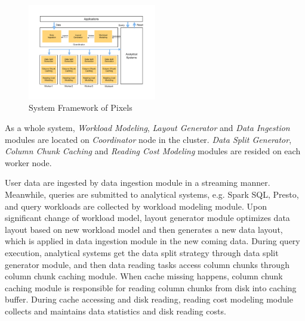 \begin{figure}[h!]
	\vspace{-1em}
	\centering
	\includegraphics[width=0.5\textwidth, height=0.36\textwidth]{figs/framework}
	\vspace{-3em}
	\caption{System Framework of Pixels}\label{fig:overview}
	\vspace{-0em}
\end{figure}

As a whole system, \textit{Workload Modeling}, \textit{Layout Generator} and \textit{Data Ingestion} modules are located on \textit{Coordinator} node in the cluster. \textit{Data Split Generator}, \textit{Column Chunk Caching} and \textit{Reading Cost Modeling} modules are resided on each worker node.

User data are ingested by data ingestion module in a streaming manner.
Meanwhile, queries are submitted to analytical systems, e.g. Spark SQL, Presto, and query workloads are collected by workload modeling module.
Upon significant change of workload model, layout generator module optimizes data layout based on new workload model and then generates a new data layout, which is applied in data ingestion module in the new coming data.
During query execution, analytical systems get the data split strategy through data split generator module, and then data reading tasks access column chunks through column chunk caching module.
When cache missing happens, column chunk caching module is responsible for reading column chunks from disk into caching buffer. During cache accessing and disk reading, reading cost modeling module collects and maintains data statistics and disk reading costs.
